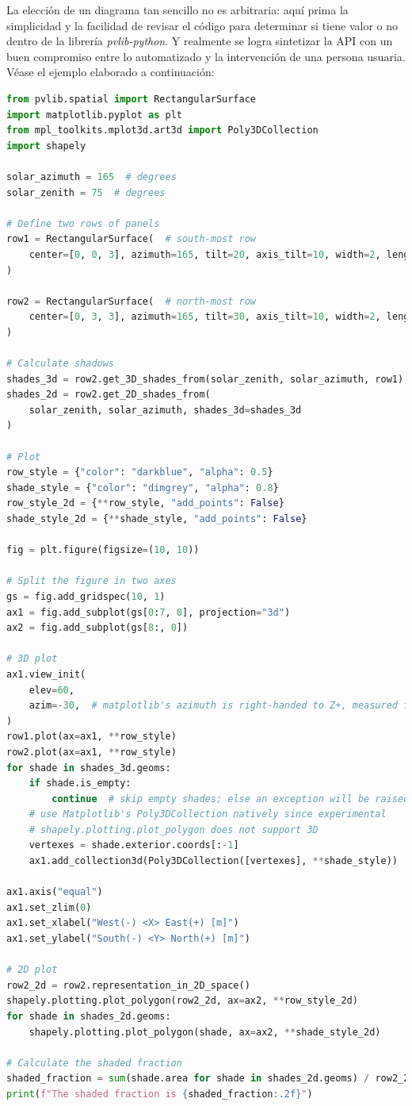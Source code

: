 La elección de un diagrama tan sencillo no es arbitraria: aquí prima la simplicidad y la facilidad de revisar el código para determinar si tiene valor o no dentro de la librería \textit{pvlib-python}. Y realmente se logra sintetizar la API con un buen compromiso entre lo automatizado y la intervención de una persona usuaria. Véase el ejemplo elaborado a continuación:

\begin{lstlisting}[language=Python, caption={Caso de uso de ejemplo para la propuesta de cálculo de sombras en 3D.}, label={lst:sombreado_3d}]
from pvlib.spatial import RectangularSurface
import matplotlib.pyplot as plt
from mpl_toolkits.mplot3d.art3d import Poly3DCollection
import shapely

solar_azimuth = 165  # degrees
solar_zenith = 75  # degrees

# Define two rows of panels
row1 = RectangularSurface(  # south-most row
    center=[0, 0, 3], azimuth=165, tilt=20, axis_tilt=10, width=2, length=20
)

row2 = RectangularSurface(  # north-most row
    center=[0, 3, 3], azimuth=165, tilt=30, axis_tilt=10, width=2, length=20
)

# Calculate shadows
shades_3d = row2.get_3D_shades_from(solar_zenith, solar_azimuth, row1)
shades_2d = row2.get_2D_shades_from(
    solar_zenith, solar_azimuth, shades_3d=shades_3d
)

# Plot
row_style = {"color": "darkblue", "alpha": 0.5}
shade_style = {"color": "dimgrey", "alpha": 0.8}
row_style_2d = {**row_style, "add_points": False}
shade_style_2d = {**shade_style, "add_points": False}

fig = plt.figure(figsize=(10, 10))

# Split the figure in two axes
gs = fig.add_gridspec(10, 1)
ax1 = fig.add_subplot(gs[0:7, 0], projection="3d")
ax2 = fig.add_subplot(gs[8:, 0])

# 3D plot
ax1.view_init(
    elev=60,
    azim=-30,  # matplotlib's azimuth is right-handed to Z+, measured from X+
)
row1.plot(ax=ax1, **row_style)
row2.plot(ax=ax1, **row_style)
for shade in shades_3d.geoms:
    if shade.is_empty:
        continue  # skip empty shades; else an exception will be raised
    # use Matplotlib's Poly3DCollection natively since experimental
    # shapely.plotting.plot_polygon does not support 3D
    vertexes = shade.exterior.coords[:-1]
    ax1.add_collection3d(Poly3DCollection([vertexes], **shade_style))

ax1.axis("equal")
ax1.set_zlim(0)
ax1.set_xlabel("West(-) <X> East(+) [m]")
ax1.set_ylabel("South(-) <Y> North(+) [m]")

# 2D plot
row2_2d = row2.representation_in_2D_space()
shapely.plotting.plot_polygon(row2_2d, ax=ax2, **row_style_2d)
for shade in shades_2d.geoms:
    shapely.plotting.plot_polygon(shade, ax=ax2, **shade_style_2d)

# Calculate the shaded fraction
shaded_fraction = sum(shade.area for shade in shades_2d.geoms) / row2_2d.area
print(f"The shaded fraction is {shaded_fraction:.2f}")
\end{lstlisting}


